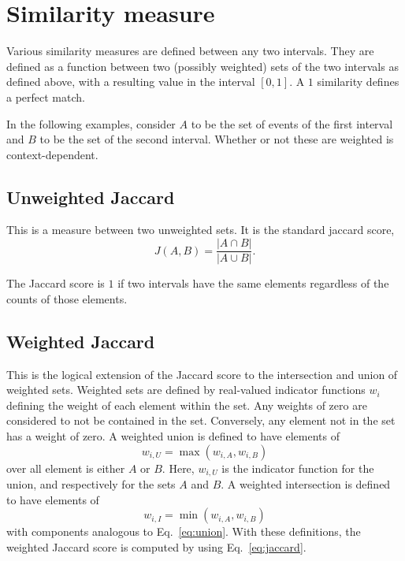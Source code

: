 \documentclass[draft]{article}
\begin{document}
\section{Similarity measure}
\label{sec:meth-similarity}

Various similarity measures are defined between any two intervals.
They are defined as a function between two (possibly weighted) sets of
the two intervals as defined above, with a resulting value in the
interval $[0,1]$.  A $1$ similarity defines a perfect match.

In the following examples, consider $A$ to be the set of events of the
first interval and $B$ to be the set of the second interval.  Whether
or not these are weighted is context-dependent.

\subsection{Unweighted Jaccard}
This is a measure between two unweighted sets.  It is the standard
jaccard score,
\begin{equation}
  \label{eq:jaccard}
  J(A,B) = \frac{|A \cap B|}{|A \cup B|}.
\end{equation}

The Jaccard score is $1$ if two intervals have the same elements
regardless of the counts of those elements.

\subsection{Weighted Jaccard}
This is the logical extension of the Jaccard score to the intersection
and union of weighted sets.  Weighted sets are defined by real-valued
indicator functions $w_{i}$ defining the weight of each element within
the set.  Any weights of zero are considered to not be contained in
the set.  Conversely, any element not in the set has a weight of zero.
A weighted union is defined to have elements of
\begin{equation}
  \label{eq:union}
  w_{i,U} = \max(w_{i,A}, w_{i,B})
\end{equation}
over all element is either $A$ or $B$.  Here, $w_{i,U}$ is the
indicator function for the union, and respectively for the sets $A$
and $B$.  A weighted intersection is defined to have elements of
\begin{equation}
  w_{i,I} = \min(w_{i,A}, w_{i,B})
\end{equation}
with components analogous to Eq.~\ref{eq:union}.  With these
definitions, the weighted Jaccard score is computed by using
Eq.~\ref{eq:jaccard}.
\end{document}
